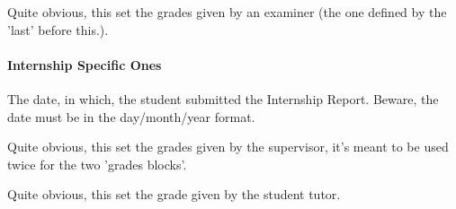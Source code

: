 \documentclass[article,nogeometry,english,tocdepth=3,secdepth=3]{ufrgscca} %
\begin{document}
	\begin{codestore}[st=d.distinct]
\end{codestore}



\begin{codedescribe}{\examinergrades}
	\begin{codesyntax}%
	\end{codesyntax}
Quite obvious, this set the grades given by an examiner (the one defined by the 'last' \tsmacro{\examiner}{} before this.).
\end{codedescribe}

\paragraph{Internship Specific Ones}

\begin{codedescribe}{\studentturnindate}
    \begin{codesyntax}%
    \end{codesyntax}
    The date, in which, the student submitted the Internship Report. Beware, the date must be in the day/month/year format.
\end{codedescribe}

\begin{codedescribe}{\internshipsupervisorgrades}
    \begin{codesyntax}
    \end{codesyntax}
    Quite obvious, this set the grades given by the supervisor, it's meant to be used twice for the two 'grades blocks'.
\end{codedescribe}

\begin{codedescribe}{\internshiptutorgrades}
    \begin{codesyntax}%
    \end{codesyntax}
    Quite obvious, this set the grade given by the student tutor.
\end{codedescribe}
\end{document}
